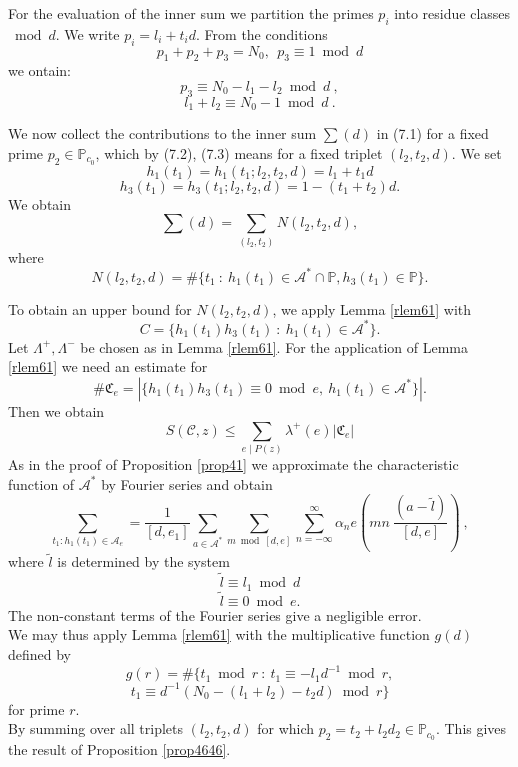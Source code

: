\documentclass{amsart}
\numberwithin{equation}{subsection}
\begin{document}
For the evaluation of the inner sum we partition the primes $p_i$ into residue classes $\bmod d$. We write  \mbox{$p_i=l_i+t_id$}. From the conditions
$$p_1+p_2+p_3=N_0,\ \ p_3\equiv 1 \bmod d$$
we ontain:
\[
p_3\equiv N_0-l_1-l_2 \bmod d\:,\tag{7.2}
\]
\[
l_1+l_2\equiv N_0-1 \bmod d\:.\tag{7.3}
\]

We now collect the contributions to the inner sum $\sum (d)$ in (7.1) for a fixed prime $p_2\in\mathbb{P}_{c_0}$, which by (7.2), (7.3) means for a fixed triplet $(l_2, t_2, d)$. We set
$$h_1(t_1)=h_1(t_1; l_2, t_2, d)=l_1+t_1d$$
$$h_3(t_1)=h_3(t_1; l_2, t_2, d)= 1-(t_1+t_2)d.$$
We obtain
$$\sum(d)=\sum_{(l_2, t_2)} N(l_2, t_2, d),$$
where 
$$N(l_2, t_2, d)=\#\{ t_1\::\: h_1(t_1)\in \mathcal{A^*}\cap \mathbb{P}, h_3(t_1)\in\mathbb{P} \}.$$

To obtain an upper bound for $N(l_2, t_2, d)$, we apply Lemma \ref{rlem61} with 
$$C=\{ h_1(t_1) h_3(t_1)\::\: h_1(t_1)\in \mathcal{A}^*  \}.$$
Let $\Lambda^+, \Lambda^{-}$ be chosen as in Lemma \ref{rlem61}. For the application of Lemma \ref{rlem61} we need an estimate for
$$\#\mathfrak{C}_e=|\{h_1(t_1) h_3(t_1) \equiv 0 \bmod e,\ h_1(t_1)\in \mathcal{A}^* \}|.$$
Then we obtain
$$S(\mathcal{C}, z)\leq \sum_{e\mid P(z)} \lambda^+(e) |\mathfrak{C}_e|$$
As in the proof of Proposition \ref{prop41} we approximate the characteristic function of $\mathcal{A}^*$ by Fourier series and obtain
$$\sum_{t_1: h_1(t_1)\in \mathcal{A}_e}=\frac{1}{[d, e_1]}\sum_{a\in \mathcal{A}^*}\sum_{m \bmod [d,e]} \sum_{n=-\infty}^\infty \alpha_n e\left( mn\:\frac{(a-\tilde{l})}{[d,e]} \right)\:,$$
where $\tilde{l}$ is determined by the system
$$\tilde{l}\equiv l_1 \bmod d$$
$$\tilde{l} \equiv 0 \bmod e.$$
The non-constant terms of the Fourier series give a negligible error.\\
We may thus apply Lemma \ref{rlem61} with the multiplicative function $g(d)$ defined by 
$$g(r)=\#\{ t_1 \bmod r\::\: t_1 \equiv -l_1 d^{-1} \bmod r, $$
$$ t_1\equiv d^{-1} (N_0-(l_1+l_2)-t_2d) \bmod r  \}$$
for prime $r$.\\
By summing over all triplets $(l_2, t_2, d)$ for which $p_2=t_2+l_2d_2\in \mathbb{P}_{c_0}$. This gives the result of Proposition  \ref{prop4646}.







\end{document}
